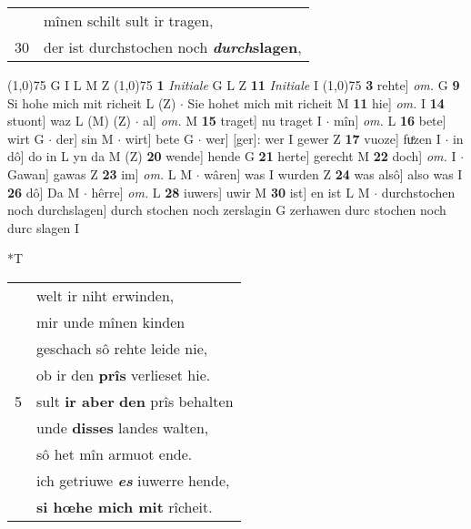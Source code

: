 \documentclass[8pt,a4paper,notitlepage]{article}
\begin{document}
\begin{table}[ht]
\begin{minipage}[t]{0.5\linewidth}
\begin{tabular}{rl}
 & mînen schilt sult ir tragen,\\ 
30 & der ist durchstochen noch \textbf{\textit{durch}slagen},\\ 
\end{tabular}
\scriptsize
\line(1,0){75} \newline
G I L M Z \newline
\line(1,0){75} \newline
\textbf{1} \textit{Initiale} G L Z  \textbf{11} \textit{Initiale} I  \newline
\line(1,0){75} \newline
\textbf{3} rehte] \textit{om.} G \textbf{9} Si hohe mich mit richeit L (Z)  $\cdot$ Sie hohet mich mit richeit M \textbf{11} hie] \textit{om.} I \textbf{14} stuont] waz L (M) (Z)  $\cdot$ al] \textit{om.} M \textbf{15} traget] nu traget I  $\cdot$ mîn] \textit{om.} L \textbf{16} bete] wirt G  $\cdot$ der] sin M  $\cdot$ wirt] bete G  $\cdot$ wer] [ger]: wer I gewer Z \textbf{17} vuoze] fuͤzen I  $\cdot$ in dô] do in L yn da M (Z) \textbf{20} wende] hende G \textbf{21} herte] gerecht M \textbf{22} doch] \textit{om.} I  $\cdot$ Gawan] gawas Z \textbf{23} im] \textit{om.} L M  $\cdot$ wâren] was I wurden Z \textbf{24} was alsô] also was I \textbf{26} dô] Da M  $\cdot$ hêrre] \textit{om.} L \textbf{28} iuwers] uwir M \textbf{30} ist] en ist L M  $\cdot$ durchstochen noch durchslagen] durch stochen noch zerslagin G zerhawen durc stochen noch durc slagen I \newline
\end{minipage}
\hspace{0.5cm}
\begin{minipage}[t]{0.5\linewidth}
\small
\begin{center}*T
\end{center}
\begin{tabular}{rl}
 & welt ir niht erwinden,\\ 
 & mir unde mînen kinden\\ 
 & geschach sô rehte leide nie,\\ 
 & ob ir den \textbf{prîs} verlieset hie.\\ 
5 & sult \textbf{ir aber} \textbf{den} prîs behalten\\ 
 & unde \textbf{disses} landes walten,\\ 
 & sô het mîn armuot ende.\\ 
 & ich getriuwe \textit{\textbf{es}} iuwerre hende,\\ 
 & \textbf{si hœhe mich mit} rîcheit.\\ 

\end{tabular}
\end{minipage}
\end{table}
\end{document}
